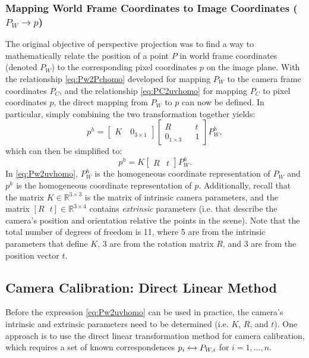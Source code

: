\subsubsection{Mapping World Frame Coordinates to Image Coordinates ($P_W \xrightarrow{} p$)}
The original objective of perspective projection was to find a way to mathematically relate the position of a point $P$ in world frame coordinates (denoted $P_W$) to the corresponding pixel coordinates $p$ on the image plane. With the relationship \eqref{eq:Pw2Pchomo} developed for mapping $P_W$ to the camera frame coordinates $P_C$, and the relationship \eqref{eq:PC2uvhomo} for mapping $P_C$ to pixel coordinates $p$, the direct mapping from $P_W$ to $p$ can now be defined. In particular, simply combining the two transformation together yields:
\begin{equation*}
p^h = \begin{bmatrix}
K \quad 0_{3\times 1}
\end{bmatrix}
\begin{bmatrix}
R && t \\
0_{1 \times 3} && 1
\end{bmatrix}
P_W^h,
\end{equation*}
which can then be simplified to:
\begin{equation} \label{eq:Pw2uvhomo}
p^h = K\begin{bmatrix}
    R & t
\end{bmatrix} P_W^h.
\end{equation}
In \eqref{eq:Pw2uvhomo}, $P_W^h$ is the homogeneous coordinate representation of $P_W$ and $p^h$ is the homogeneous coordinate representation of $p$. Additionally, recall that the matrix $K \in \mathbb{R}^{3\times3}$ is the matrix of intrinsic camera parameters, and the matrix $[R \:\:\: t] \in \mathbb{R}^{3\times 4}$ contains \textit{extrinsic} parameters (i.e. that describe the camera's position and orientation relative the points in the scene). Note that the total number of degrees of freedom is 11, where 5 are from the intrinsic parameters that define $K$, 3 are from the rotation matrix $R$, and 3 are from the position vector $t$.

\subsection{Camera Calibration: Direct Linear Method}
Before the expression \eqref{eq:Pw2uvhomo} can be used in practice, the camera's intrinsic and extrinsic parameters need to be determined (i.e. $K$, $R$, and $t$). One approach is to use the direct linear transformation method for camera calibration, which requires a set of known correspondences $p_i \xleftrightarrow[]{} P_{W,i}$ for $i = 1,\dots,n$.

